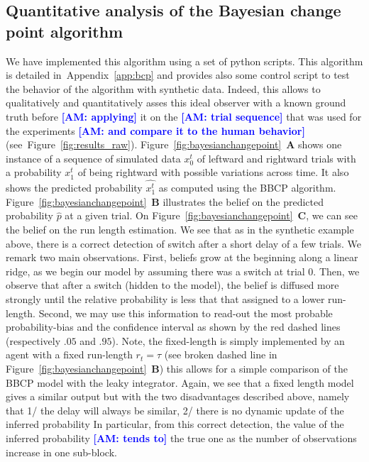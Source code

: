 \documentclass[12pt,english]{article}%
\newcommand{\seeFig}[1]{Figure~\ref{fig:#1}}
\newcommand{\seeApp}[1]{Appendix~\ref{app:#1}}
\newcommand{\AM}[1]{\textbf{\textcolor{blue}{[AM: #1]}}}
\begin{document}
\subsection{Quantitative analysis of the Bayesian change point algorithm}
We have implemented this algorithm using a set of python scripts.
This algorithm is detailed in~\seeApp{bcp} and provides also some control script
to test the behavior of the algorithm with synthetic data.
Indeed, this allows to qualitatively and quantitatively asses
this ideal observer with a known ground truth before \AM{applying} it
on the \AM{trial sequence} that was used for the experiments \AM{and compare it to the human behavior} (see~\seeFig{results_raw}).
\seeFig{bayesianchangepoint}~\textbf{A} shows
one instance of a sequence of simulated data $x_0^t$
of leftward and rightward trials with a probability $x_1^t$
of being rightward with possible variations across time.
It also shows the predicted probability $\hat{x_1^t}$
as computed using the BBCP algorithm.
\seeFig{bayesianchangepoint}~\textbf{B} illustrates
the belief on the predicted probability $\hat{p}$ at a given trial.
On \seeFig{bayesianchangepoint}~\textbf{C},
we can see the belief on the run length estimation.
We see that as in the synthetic example above,
there is a correct detection of switch after a short delay of a few trials.
We remark two main observations.
First, beliefs grow at the beginning along a linear ridge,
as we begin our model by assuming there was a switch at trial $0$.
Then, we observe that after a switch (hidden to the model),
the belief is diffused more strongly until the relative probability
is less that that assigned to a lower run-length.
Second, we may use this information to read-out the most probable probability-bias and the confidence interval
as shown by the red dashed lines (respectively $.05$ and $.95$).
Note, the fixed-length is simply implemented
by an agent with a fixed run-length $r_t=\tau$ (see broken dashed line in \seeFig{bayesianchangepoint}~\textbf{B})
this allows for a simple comparison of the BBCP model with the leaky integrator.
Again, we see that a fixed length model gives a similar output
but with the two disadvantages described above,  namely that
1/ the delay will always be similar,
2/ there is no dynamic update of the inferred probability
In particular, from this correct detection,
the value of the inferred probability \AM{tends to} the true one as the number of observations increase in one sub-block.
\end{document}

